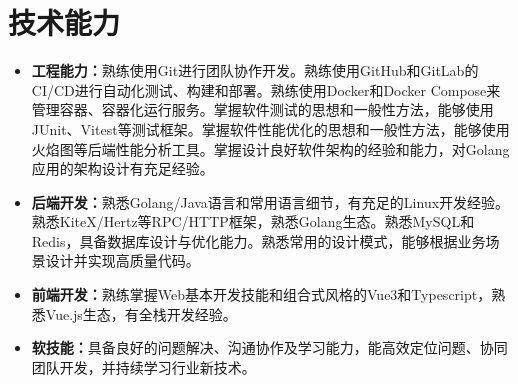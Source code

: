 \documentclass{style/template}
\begin{document}
\section{技术能力}

\begin{itemize}
    \item \textbf{工程能力：}熟练使用Git进行团队协作开发。熟练使用GitHub和GitLab的CI/CD进行自动化测试、构建和部署。熟练使用Docker和Docker Compose来管理容器、容器化运行服务。掌握软件测试的思想和一般性方法，能够使用JUnit、Vitest等测试框架。掌握软件性能优化的思想和一般性方法，能够使用火焰图等后端性能分析工具。掌握设计良好软件架构的经验和能力，对Golang应用的架构设计有充足经验。
    \item \textbf{后端开发：}熟悉Golang/Java语言和常用语言细节，有充足的Linux开发经验。熟悉KiteX/Hertz等RPC/HTTP框架，熟悉Golang生态。熟悉MySQL和Redis，具备数据库设计与优化能力。熟悉常用的设计模式，能够根据业务场景设计并实现高质量代码。
    \item \textbf{前端开发：}熟练掌握Web基本开发技能和组合式风格的Vue3和Typescript，熟悉Vue.js生态，有全栈开发经验。
    \item \textbf{软技能：}具备良好的问题解决、沟通协作及学习能力，能高效定位问题、协同团队开发，并持续学习行业新技术。
\end{itemize}
\end{document}
